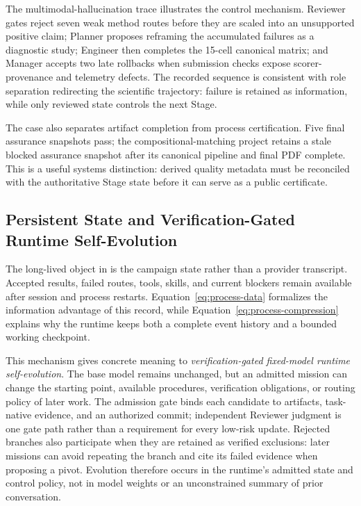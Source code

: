 The multimodal-hallucination trace illustrates the control mechanism. Reviewer
gates reject seven weak method routes before they are scaled into an unsupported
positive claim; Planner proposes reframing the accumulated failures as a diagnostic study;
Engineer then completes the 15-cell canonical matrix; and Manager accepts two late
rollbacks when submission checks expose scorer-provenance and telemetry defects.
The recorded sequence is consistent with role separation redirecting the scientific
trajectory: failure is
retained as information, while only reviewed state controls the next Stage.

The case also separates artifact completion from process certification. Five final
assurance snapshots pass; the compositional-matching project retains a stale blocked
assurance snapshot after its canonical pipeline and final PDF complete. This is a
useful systems distinction: derived quality metadata must be reconciled with the
authoritative Stage state before it can serve as a public certificate.

\subsection{Persistent State and Verification-Gated Runtime Self-Evolution}

The long-lived object in \systemname is the campaign state rather than a provider
transcript. Accepted results, failed routes, tools, skills, and current blockers
remain available after session and process restarts. Equation~\ref{eq:process-data}
formalizes the information advantage of this record, while
Equation~\ref{eq:process-compression} explains why the runtime keeps both a complete
event history and a bounded working checkpoint.

This mechanism gives concrete meaning to \emph{verification-gated fixed-model runtime
self-evolution}. The base model remains unchanged, but an admitted mission can
change the starting point, available procedures, verification obligations, or
routing policy of later work. The admission gate binds each candidate to artifacts,
task-native evidence, and an authorized commit; independent Reviewer judgment is one
gate path rather than a requirement for every low-risk update. Rejected branches
also participate when they are retained as verified exclusions: later missions can
avoid repeating the branch and cite its failed evidence when proposing a pivot.
Evolution therefore occurs in the runtime's admitted state and control policy, not
in model weights or an unconstrained summary of prior conversation.

